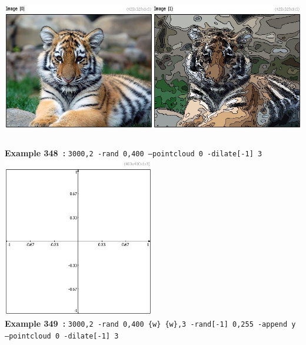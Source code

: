 \documentclass[a4paper,11pt,twoside]{book}
\begin{document}
\begin{center}\includegraphics[keepaspectratio=true,height=7cm,width=\textwidth]{img/gmic_def348.jpg}\\
{\footnotesize \textbf{Example 348~:} \texttt{3000,2 -rand 0,400 --pointcloud 0 -dilate[-1] 3}}
\\\includegraphics[keepaspectratio=true,height=7cm,width=\textwidth]{img/gmic_def349.jpg}\\
{\footnotesize \textbf{Example 349~:} \texttt{3000,2 -rand 0,400 \{w\} \{w\},3 -rand[-1] 0,255 -append y --pointcloud 0 -dilate[-1] 3}}
\end{center}
\end{document}
